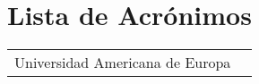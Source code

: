 \chapter*{Lista de Acrónimos}
\begin{longtable}{@{}p{3cm}@{}p{\dimexpr\textwidth-1cm\relax}@{}}


\nomenclature{\textbf{UNADE}}			{Universidad Americana de Europa}

\end{longtable}
